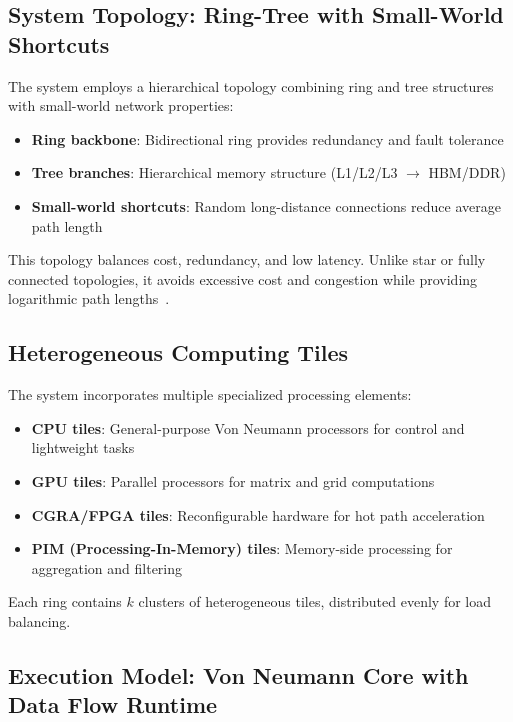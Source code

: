 \documentclass[11pt,a4paper]{article}
\begin{document}
\subsection{System Topology: Ring-Tree with Small-World Shortcuts}

The system employs a hierarchical topology combining ring and tree structures with small-world network properties:

\begin{itemize}
\item \textbf{Ring backbone}: Bidirectional ring provides redundancy and fault tolerance
\item \textbf{Tree branches}: Hierarchical memory structure (L1/L2/L3 $\rightarrow$ HBM/DDR)
\item \textbf{Small-world shortcuts}: Random long-distance connections reduce average path length
\end{itemize}

This topology balances cost, redundancy, and low latency. Unlike star or fully connected topologies, it avoids excessive cost and congestion while providing logarithmic path lengths~\citep{watts1998collective}.

\subsection{Heterogeneous Computing Tiles}

The system incorporates multiple specialized processing elements:

\begin{itemize}
\item \textbf{CPU tiles}: General-purpose Von Neumann processors for control and lightweight tasks
\item \textbf{GPU tiles}: Parallel processors for matrix and grid computations
\item \textbf{CGRA/FPGA tiles}: Reconfigurable hardware for hot path acceleration
\item \textbf{PIM (Processing-In-Memory) tiles}: Memory-side processing for aggregation and filtering
\end{itemize}

Each ring contains $k$ clusters of heterogeneous tiles, distributed evenly for load balancing.

\subsection{Execution Model: Von Neumann Core with Data Flow Runtime}
\end{document}
